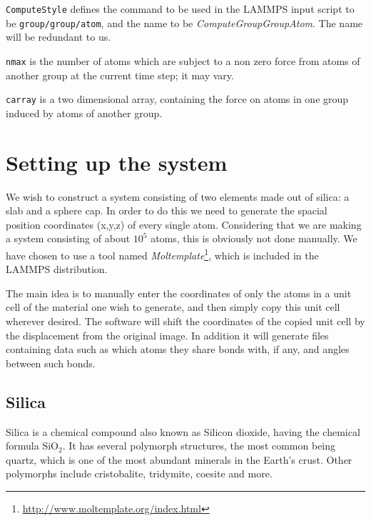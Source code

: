 \documentclass[twoside,english]{uiofysmaster}
\begin{document}


\texttt{ComputeStyle} defines the command to be used in the LAMMPS input script to be \texttt{group/group/atom}, and the name to be \textit{ComputeGroupGroupAtom}. The name will be redundant to us. 

\texttt{nmax} is the number of atoms which are subject to a non zero force from atoms of another group at the current time step; it may vary.

\texttt{carray} is a two dimensional array, containing the force on atoms in one group induced by atoms of another group. 










\chapter{Setting up the system}

We wish to construct a system consisting of {\color{red} two} elements made out of silica: a slab and a sphere cap. In order to do this we need to generate the spacial position coordinates (x,y,z) of every single atom. Considering that we are making a system consisting of about $10^5$ atoms, this is obviously not done manually. We have chosen to use a tool named \textit{Moltemplate}\footnote{\href{http://www.moltemplate.org/index.html}{http://www.moltemplate.org/index.html}}, which is included in the LAMMPS distribution.

The main idea is to manually enter the coordinates of only the atoms in a unit cell of the material one wish to generate, and then simply copy this unit cell wherever desired. The software will shift the coordinates of the copied unit cell by the displacement from the original image. In addition it will generate files containing data such as which atoms they share bonds with, if any, and angles between such bonds. 

\section{Silica}
Silica is a chemical compound also known as Silicon dioxide, having the chemical formula SiO$_2$. It has several polymorph structures, the most common being quartz, which is one of the most abundant minerals in the Earth's crust. Other polymorphs include cristobalite, tridymite, coesite and more.    
\end{document}
